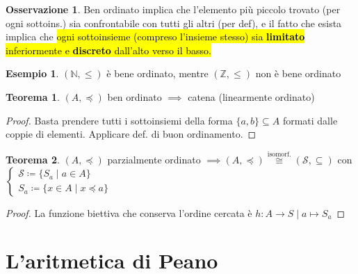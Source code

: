 \documentclass[a4paper,10pt]{article}
\theoremstyle{definition}
\newcommand{\na}{\mathbb{N}} %
\newcommand{\za}{\mathbb{Z}} %
\theoremstyle{indentdefinition}
\theoremstyle{indentpostulate}
\theoremstyle{indenttheorem}
\newtheorem{thm}{Teorema}[section]
\theoremstyle{myremark}
\newtheorem*{rem*}{Osservazione}
\newtheorem{example*}{Esempio}
\theoremstyle{indentgeneral}
\newenvironment{myboxed} 
{\noindent\begin{lrbox}{\mybox}\begin{minipage}{\textwidth}}
{\end{minipage}\end{lrbox}\fbox{\usebox{\mybox}}}
\begin{document}
\begin{rem*}
    Ben ordinato implica che l'elemento più piccolo trovato (per ogni sottoins.) sia confrontabile con tutti gli altri (per def), e il fatto che esista implica che \hl{ogni sottoinsieme (compreso l'insieme stesso) sia \textbf{limitato} inferiormente e \textbf{discreto} dall'alto verso il basso.}
\end{rem*}

\begin{example*}
    $(\na,\le)$ è bene ordinato, mentre $(\za,\le)$ non è bene ordinato
\end{example*}

\begin{myboxed}
\begin{thm}
    $(A,\preceq)$ ben ordinato $\implies$ catena (linearmente ordinato)
\end{thm}
\end{myboxed}

\begin{proof}
    Basta prendere tutti i sottoinsiemi della forma $\{a,b\}\subseteq A$ formati dalle coppie di elementi. Applicare def. di buon ordinamento.
\end{proof}

\begin{thm}
     $(A,\preceq)$ parzialmente ordinato $\implies (A,\preceq)\overset{\text{isomorf.}}{\cong}(\mathscr{S},\subseteq)$ con $\begin{cases}
       \mathscr{S}\coloneqq \{S_a\mid a\in A\}\\
       S_a\coloneqq \{x\in A\mid x\preceq a\}
     \end{cases}$ 
\end{thm}

\begin{proof}
    La funzione biettiva che conserva l'ordine cercata è $h:A\to S\mid a\mapsto S_a$
\end{proof}



\pagebreak{}
\section{L’aritmetica di Peano}
\end{document}
